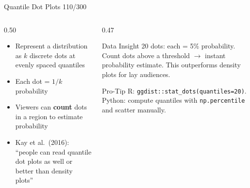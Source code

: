 \documentclass[10pt]{beamer}
\newcommand{\smark}[1]{\hfill{\scriptsize\color{codegray}#1}}
\begin{document}
\begin{frame}{Quantile Dot Plots}
\smark{110/300}
\begin{columns}[T]
\begin{column}{0.50\textwidth}
\begin{itemize}
    \item Represent a distribution as $k$ discrete dots at evenly spaced quantiles
    \item Each dot = $1/k$ probability
    \item Viewers can \textbf{count} dots in a region to estimate probability
    \item Kay et al.\ (2016): ``people can read quantile dot plots as well or better than density plots''
\end{itemize}
\end{column}
\begin{column}{0.47\textwidth}
\begin{exampleblock}{Data Insight}
    \scriptsize 20 dots: each = 5\% probability. Count dots above a threshold $\to$ instant probability estimate. This outperforms density plots for lay audiences.
\end{exampleblock}
\vspace{0.2cm}
\begin{alertblock}{Pro-Tip}
    \scriptsize R: \texttt{ggdist::stat\_dots(quantiles=20)}. Python: compute quantiles with \texttt{np.percentile} and scatter manually.
\end{alertblock}
\end{column}
\end{columns}
\end{frame}
\end{document}
